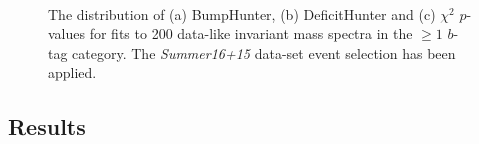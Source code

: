 \begin{figure}[!htb]
\begin{center}
  \\
  \end{center}
  \caption{The distribution of (a) BumpHunter, (b) DeficitHunter and (c) $\chi^{2}$ $p$-values for fits to
    200 data-like invariant mass spectra in the $\geq1$ $b$-tag category.
    The \textit{Summer16+15} data-set event selection has been applied.}
  \label{fig:pValueHists_bj}
\end{figure}

\FloatBarrier

%
  
\subsection{Results}
\label{sec:bkg-summer_results}

